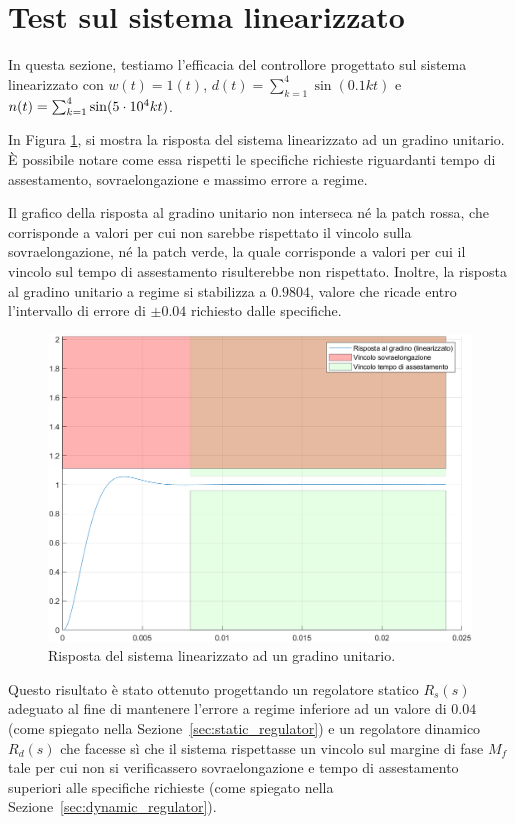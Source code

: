 \documentclass[a4paper, 11pt]{article}
\begin{document}
\section{Test sul sistema linearizzato}

In questa sezione, testiamo l'efficacia del controllore progettato sul sistema linearizzato con $w(t) = 1(t)$, $d(t)=\sum_{k = 1}^{4} \sin(0.1kt)$ e $n(t)=\sum_{k = 1}^{4} \sin(5\space\cdot\space 10^{4}kt) $.

In Figura \ref{fig:step_response}, si mostra la risposta del sistema linearizzato ad un gradino unitario. \`E possibile notare come essa rispetti le specifiche richieste riguardanti tempo di assestamento, sovraelongazione e massimo errore a regime. 

Il grafico della risposta al gradino unitario non interseca né la patch rossa, che corrisponde a valori per cui non sarebbe rispettato il vincolo sulla sovraelongazione,
né la patch verde, la quale corrisponde a valori per cui il vincolo sul tempo di assestamento risulterebbe non rispettato. 
Inoltre, la risposta al gradino unitario a regime si stabilizza a $0.9804$, valore che ricade entro l'intervallo di errore di $\pm0.04$ richiesto dalle specifiche.

\begin{figure}[h!]
	\centering
	\includegraphics[width=0.75\linewidth]{./images/stepRespLin.png}
	\caption{Risposta del sistema linearizzato ad un gradino unitario.}
	\label{fig:step_response}
\end{figure}

Questo risultato \`e stato ottenuto progettando un regolatore statico $R_s(s)$ adeguato al fine di mantenere l'errore a regime inferiore ad un valore di $0.04$ (come spiegato nella Sezione~\ref{sec:static_regulator}) 
e un regolatore dinamico $R_d(s)$ che facesse s\`i che il sistema rispettasse un vincolo sul margine di fase $M_f$ tale per cui non si verificassero sovraelongazione e tempo di assestamento superiori alle specifiche richieste
(come spiegato nella Sezione~\ref{sec:dynamic_regulator}).
\end{document}
